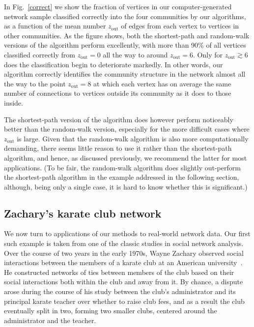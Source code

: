 \documentclass[twocolumn,pre,superscriptaddress]{revtex4}
\begin{document}
In Fig.~\ref{correct} we show the fraction of vertices in our
computer-generated network sample classified correctly into the four
communities by our algorithms, as a function of the mean number
$z_\mathrm{out}$ of edges from each vertex to vertices in other
communities.  As the figure shows, both the shortest-path and random-walk
versions of the algorithm perform excellently, with more than 90\% of all
vertices classified correctly from $z_\mathrm{out}=0$ all the way to around
$z_\mathrm{out}=6$.  Only for $z_\mathrm{out}\gtrsim6$ does the
classification begin to deteriorate markedly.  In other words, our
algorithm correctly identifies the community structure in the network
almost all the way to the point $z_\mathrm{out}=8$ at which each vertex has
on average the same number of connections to vertices outside its community
as it does to those inside.

The shortest-path version of the algorithm does however perform noticeably
better than the random-walk version, especially for the more difficult
cases where $z_\mathrm{out}$ is large.  Given that the random-walk
algorithm is also more computationally demanding, there seems little reason
to use it rather than the shortest-path algorithm, and hence, as discussed
previously, we recommend the latter for most applications.  (To be fair,
the random-walk algorithm does slightly out-perform the shortest-path
algorithm in the example addressed in the following section, although,
being only a single case, it is hard to know whether this is significant.)


\subsection{Zachary's karate club network}
\label{karate}
We now turn to applications of our methods to real-world network data.  Our
first such example is taken from one of the classic studies in social
network analysis.  Over the course of two years in the early 1970s, Wayne
Zachary observed social interactions between the members of a karate club
at an American university~\cite{Zachary77}.  He constructed networks of
ties between members of the club based on their social interactions both
within the club and away from it.  By chance, a dispute arose during the
course of his study between the club's administrator and its principal
karate teacher over whether to raise club fees, and as a result the club
eventually split in two, forming two smaller clubs, centered around the
administrator and the teacher.
\end{document}
